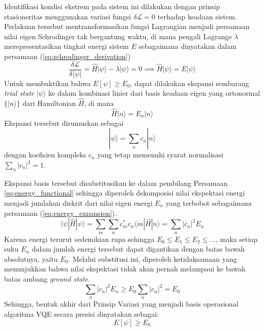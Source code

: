 Identifikasi kondisi ekstrem pada sistem ini dilakukan dengan prinsip stasioneritas menggunakan variasi fungsi $\delta \mathcal{L} = 0$ terhadap keadaan sistem. Perlakuan tersebut mentransformasikan fungsi Lagrangian menjadi persamaan nilai eigen Schrodinger tak bergantung waktu, di mana pengali Lagrange $\lambda$ merepresentasikan tingkat energi sistem $E$ sebagaimana dinyatakan dalam persamaan (\ref{eq:schrodinger_derivation})
\begin{equation}
\frac{\delta \mathcal{L}}{\delta \langle \psi |} = \hat{H} |\psi\rangle - \lambda |\psi\rangle = 0 \implies \hat{H} |\psi\rangle = E |\psi\rangle
\label{eq:schrodinger_derivation}
\end{equation}
Untuk membuktikan bahwa $E[\psi] \ge E_0$, dapat dilakukan ekspansi sembarang \textit{trial state} $|\psi\rangle$ ke dalam kombinasi linier dari basis keadaan eigen yang ortonormal $\{|n\rangle\}$ dari Hamiltonian $\hat{H}$, di mana 
\begin{equation}
\hat{H}|n\rangle = E_n|n\rangle
\end{equation}
Ekspansi tersebut dirumuskan sebagai 
\begin{equation}
|\psi\rangle = \sum_n c_n |n\rangle
\label{eq:trial_state_expansion}
\end{equation}
dengan koefisien kompleks $c_n$ yang tetap memenuhi syarat normalisasi $\sum_n |c_n|^2 = 1$.

Ekspansi basis tersebut disubstitusikan ke dalam pembilang Persamaan \eqref{eq:energy_functional} sehingga diperoleh dekomposisi nilai ekspektasi energi menjadi jumlahan diskrit dari nilai eigen energi $E_n$ yang terbobot sebagaimana persamaan (\ref{eq:energy_expansion}).
\begin{equation}
\langle \psi | \hat{H} | \psi \rangle = \sum_m \sum_n c_m^* c_n \langle m | \hat{H} | n \rangle = \sum_n |c_n|^2 E_n
\label{eq:energy_expansion}
\end{equation}
Karena energi terurut sedemikian rupa sehingga $E_0 \le E_1 \le E_2 \le \dots$, maka setiap suku $E_n$ dalam jumlah energi tersebut dapat digantikan dengan batas bawah absolutnya, yaitu $E_0$. Melalui substitusi ini, diperoleh ketidaksamaan yang menunjukkan bahwa nilai ekspektasi tidak akan pernah melampaui ke bawah batas ambang \textit{ground state}.
\begin{equation}
\sum_n |c_n|^2 E_n \ge E_0 \sum_n |c_n|^2 = E_0
\label{eq:variational_inequality}
\end{equation}
Sehingga, bentuk akhir dari Prinsip Variasi yang menjadi basis operasional algoritma VQE secara presisi dinyatakan sebagai:
\begin{equation}
E[\psi] \ge E_0
\label{eq:variational_principle_final}
\end{equation}

